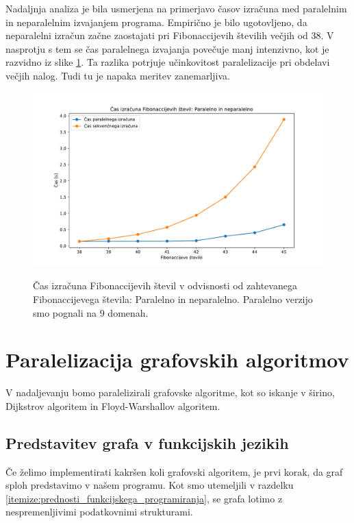 \documentclass[fin1, tisk]{fmfdelo}
\begin{document}
Nadaljnja analiza je bila usmerjena na primerjavo časov izračuna med paralelnim in neparalelnim izvajanjem programa. 
Empirično je bilo ugotovljeno, da neparalelni izračun začne zaostajati pri Fibonaccijevih številih večjih od 38. 
V nasprotju s tem se čas paralelnega izvajanja povečuje manj intenzivno, kot je razvidno iz slike
\ref{fig:fib_par_v_odvisnosti_od_n}. 
Ta razlika potrjuje učinkovitost paralelizacije pri obdelavi večjih nalog. Tudi tu je napaka meritev zanemarljiva.

\begin{figure}[h!]
  \centering
  \caption{Čas izračuna Fibonaccijevih števil v odvisnosti od zahtevanega Fibonaccijevega števila: Paralelno in neparalelno. Paralelno verzijo smo pognali na 9 domenah.}
  \includegraphics[width=15cm]{slike/fib_par_v_odvisnosti_od_n.pdf}
  \label{fig:fib_par_v_odvisnosti_od_n}
\end{figure}


\section{Paralelizacija grafovskih algoritmov}

V nadaljevanju bomo paralelizirali grafovske algoritme, kot so iskanje v širino, Dijkstrov algoritem in Floyd-Warshallov algoritem.

\subsection{Predstavitev grafa v funkcijskih jezikih}

Če želimo implementirati kakršen koli grafovski algoritem, je prvi korak, da graf sploh predstavimo v našem programu.
Kot smo utemeljili v razdelku \ref{itemize:prednosti_funkcijskega_programiranja}, se grafa lotimo z nespremenljivimi
podatkovnimi strukturami.
\end{document}
